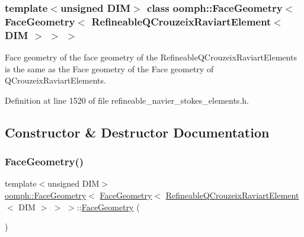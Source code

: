 \subsubsection*{template$<$unsigned D\+IM$>$\newline
class oomph\+::\+Face\+Geometry$<$ Face\+Geometry$<$ Refineable\+Q\+Crouzeix\+Raviart\+Element$<$ D\+I\+M $>$ $>$ $>$}

Face geometry of the face geometry of the Refineable\+Q\+Crouzeix\+Raviart\+Elements is the same as the Face geometry of the Face geometry of Q\+Crouzeix\+Raviart\+Elements. 

Definition at line 1520 of file refineable\+\_\+navier\+\_\+stokes\+\_\+elements.\+h.



\subsection{Constructor \& Destructor Documentation}
\mbox{\label{classoomph_1_1FaceGeometry_3_01FaceGeometry_3_01RefineableQCrouzeixRaviartElement_3_01DIM_01_4_01_4_01_4_af3742715a4d40830eee7b4adb8bd92f3}} 
\subsubsection{\texorpdfstring{Face\+Geometry()}{FaceGeometry()}}
{\footnotesize\ttfamily template$<$unsigned D\+IM$>$ \\
\hyperlink{classoomph_1_1FaceGeometry}{oomph\+::\+Face\+Geometry}$<$ \hyperlink{classoomph_1_1FaceGeometry}{Face\+Geometry}$<$ \hyperlink{classoomph_1_1RefineableQCrouzeixRaviartElement}{Refineable\+Q\+Crouzeix\+Raviart\+Element}$<$ D\+IM $>$ $>$ $>$\+::\hyperlink{classoomph_1_1FaceGeometry}{Face\+Geometry} (\begin{DoxyParamCaption}{ }\end{DoxyParamCaption})\hspace{0.3cm}{\ttfamily [inline]}}




